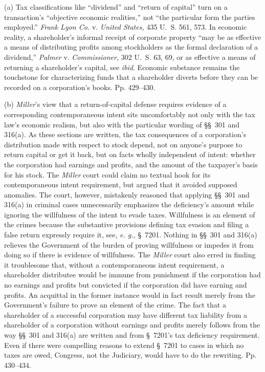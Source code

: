   (a) Tax classifications like ``dividend'' and ``return of
capital'' turn on a transaction's ``objective economic realities,''
not ``the particular form the parties employed.'' \emph{Frank Lyon
Co.} v. \emph{United States,} 435 U.~S. 561, 573. In economic
reality, a shareholder's informal receipt of corporate property
``may be as effective a means of distributing profits among
stockholders as the formal declaration of a dividend,'' \emph{Palmer}
v. \emph{Commissioner,} 302 U.~S. 63, 69, or as effective a means
of returning a shareholder's capital, see \emph{ibid}. Economic
substance remains the touchstone for characterizing funds that a
shareholder diverts before they can be recorded on a corporation's
books. Pp. 429--430.

  (b) \emph{Miller}'s view that a return-of-capital defense requires
evidence of a corresponding contemporaneous intent sits uncomfortably
not only with the tax law's economic realism, but also with the
particular wording of \S\S~301 and 316(a). As these sections are
written, the tax consequences of a corporation's distribution made
with respect to stock depend, not on anyone's purpose to return
capital or get it back, but on facts wholly independent of intent:
whether the corporation had earnings and profits, and the amount of the
taxpayer's basis for his stock. The \emph{Miller} court could claim no
textual hook for its contemporaneous intent requirement, but argued that
it avoided supposed anomalies. The court, however, mistakenly reasoned
that applying \S\S~301 and 316(a) in criminal cases unnecessarily
emphasizes the deficiency's amount while ignoring the willfulness
of the intent to evade taxes. Willfulness is an element of the crimes
because the substantive provisions defining tax evasion and filing
a false return expressly require it, see, \emph{e. g.,} \S~7201.
Nothing in \S\S~301 and 316(a) relieves the Government of the burden of
proving willfulness or impedes it from doing so if there is evidence of
willfulness. The \emph{Miller} court also erred in finding it troublesome
that, without a contemporaneous intent requirement, a shareholder
distributee would be immune from punishment if the corporation had no
earnings and profits but convicted if the corporation did have earning
and profits. An acquittal in the former instance would in fact result
merely from the Government's failure to prove an element of the
crime. The fact that a shareholder of a successful corporation may have
different tax liability from a shareholder of a corporation without
earnings and profits merely follows from the way \S\S~301 and 316(a)
are written and from \S~7201's tax deficiency requirement. Even if
there were compelling reasons to extend \S~7201 to cases in which
no taxes are owed, Congress, not the Judiciary, would have to do the
rewriting. Pp. 430--434.

